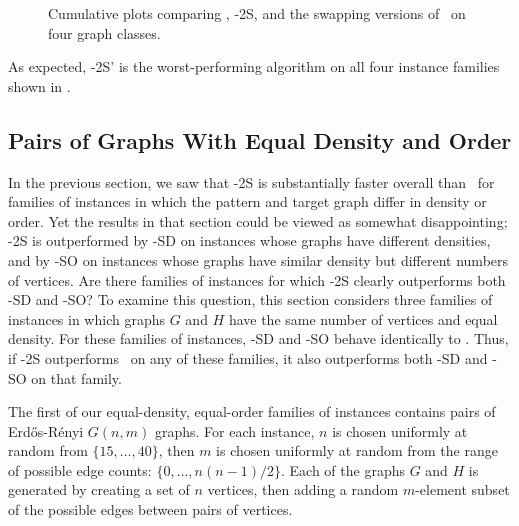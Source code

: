\begin{figure}[htb]
{        \label{figure:mcsplit2-cumulative-random4}
    }
    \caption{Cumulative plots comparing \McSplit, \McSplit-2S, and the swapping versions of \McSplit\ on four graph classes.}
    \label{figure:mcsplit2-cumulative}
\end{figure}

As expected, \McSplit-2S' is the worst-performing algorithm
on all four instance families shown in .

\subsection{Pairs of Graphs With Equal Density and Order}

In the previous section, we saw that \McSplit-2S is substantially faster overall than \McSplit\ for families
of instances in which the pattern and target graph differ in density or order.  Yet the results in that
section could be viewed as somewhat disappointing; \McSplit-2S is outperformed by \McSplit-SD on instances
whose graphs have different densities, and by \McSplit-SO on instances whose graphs have similar density
but different numbers of vertices.  Are there families of instances for which \McSplit-2S clearly outperforms
both \McSplit-SD and \McSplit-SO?  To examine this question, this section considers three families of instances
in which graphs $G$ and $H$ have the same number of vertices and equal density.  For these families
of instances, \McSplit-SD and \McSplit-SO behave identically to
\McSplit.  Thus, if \McSplit-2S outperforms \McSplit\ on any of these families, it also
outperforms both \McSplit-SD and \McSplit-SO on that family.

The first of our equal-density, equal-order families of instances contains pairs of Erd\H{o}s-Rényi $G(n,m)$ graphs.  For each instance,
$n$ is chosen uniformly at random from $\{15, \dots, 40\}$, then $m$ is chosen
uniformly at random from the range of possible edge counts: $\{0, \dots, n(n-1)/2\}$.  Each of the graphs
$G$ and $H$ is generated by creating a set of $n$ vertices, then adding
a random $m$-element subset of the possible edges
between pairs of vertices.


